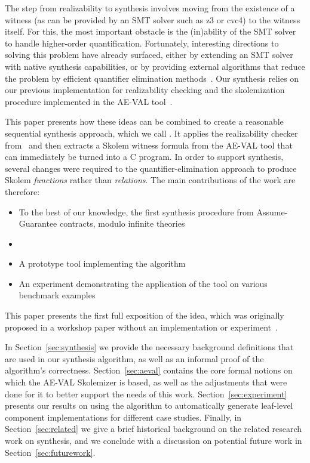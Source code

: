 The step from realizability to synthesis involves moving from the existence of a witness (as can be provided by an SMT solver such as z3 or cvc4) to the witness itself.  For this, the most important obstacle is the (in)ability of the SMT solver to handle higher-order quantification. Fortunately, interesting directions to solving this problem have already surfaced, either by extending an SMT solver with native synthesis capabilities\cite{reynoldscounterexample}, or by providing external algorithms that reduce the problem by efficient quantifier elimination methods~\cite{fedyukovichae}.  Our synthesis relies on our previous implementation for realizability checking and the skolemization procedure implemented in the AE-VAL tool~\cite{fedyukovichae}.


This paper presents how these ideas can be combined to create a reasonable sequential synthesis approach, which we call \toolname.  It applies the realizability checker from~\cite{Katis15:Realizability} and then extracts a Skolem witness formula from the AE-VAL tool that can immediately be turned into a C program.  In order to support synthesis, several changes were required to the quantifier-elimination approach to produce Skolem {\em functions} rather than {\em relations}.  The main contributions of the work are therefore:
\begin{itemize}
	\item To the best of our knowledge, the first synthesis procedure from
	Assume-Guarantee contracts, modulo infinite theories
	\item {}
	\item A prototype tool implementing the algorithm
	\item An experiment demonstrating the application of the tool on various benchmark examples
\end{itemize}

\noindent This paper presents the first full exposition of the idea, which was originally proposed in a workshop paper without an implementation or experiment~\cite{Katis16}.

In Section~\ref{sec:synthesis} we provide the necessary background
definitions that are used in our synthesis algorithm, as well as an informal
proof of the algorithm's correctness. Section~\ref{sec:aeval} contains the
core formal notions on which the AE-VAL Skolemizer is based, as well
as the adjustments that were done for it to better support the needs of this
work. Section~\ref{sec:experiment} presents our results on using the algorithm
to automatically generate leaf-level component implementations for different case studies.
Finally, in Section~\ref{sec:related} we give a brief historical background on the related research work on synthesis, and we conclude with a discussion on potential future work in Section~\ref{sec:futurework}.

